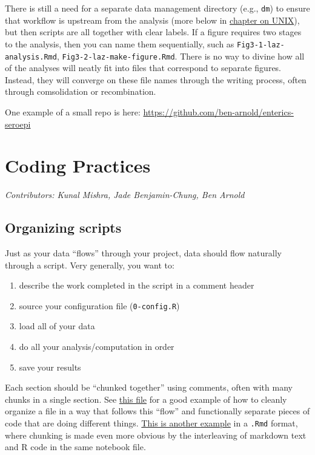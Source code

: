 \documentclass[
]{book}
\providecommand{\tightlist}{%
  \setlength{\itemsep}{0pt}\setlength{\parskip}{0pt}}
\begin{document}
There is still a need for a separate data management directory (e.g., \texttt{dm}) to ensure that workflow is upstream from the analysis (more below in \hyperref[unix]{chapter on UNIX}), but then scripts are all together with clear labels. If a figure requires two stages to the analysis, then you can name them sequentially, such as \texttt{Fig3-1-laz-analysis.Rmd}, \texttt{Fig3-2-laz-make-figure.Rmd}. There is no way to divine how all of the analyses will neatly fit into files that correspond to separate figures. Instead, they will converge on these file names through the writing process, often through comsolidation or recombination.

One example of a small repo is here:
\url{https://github.com/ben-arnold/enterics-seroepi}

\chapter{Coding Practices}\label{codingpractices}

\emph{Contributors: Kunal Mishra, Jade Benjamin-Chung, Ben Arnold}

\section{Organizing scripts}\label{organizing-scripts}

Just as your data ``flows'' through your project, data should flow naturally through a script. Very generally, you want to:

\begin{enumerate}
\def\labelenumi{\arabic{enumi}.}
\tightlist
\item
  describe the work completed in the script in a comment header
\item
  source your configuration file (\texttt{0-config.R})
\item
  load all of your data
\item
  do all your analysis/computation in order
\item
  save your results
\end{enumerate}

Each section should be ``chunked together'' using comments, often with many chunks in a single section. See \href{https://github.com/kmishra9/Flu-Absenteeism/blob/master/Master's%20Thesis%20-%20Spatial%20Epidemiology%20of%20Influenza/2a%20-%20Statistical-Inputs.R}{this file} for a good example of how to cleanly organize a file in a way that follows this ``flow'' and functionally separate pieces of code that are doing different things. \href{https://github.com/ben-arnold/enterics-seroepi/blob/master/R/Fig1-haiti-ab-distributions.Rmd}{This is another example} in a \texttt{.Rmd} format, where chunking is made even more obvious by the interleaving of markdown text and R code in the same notebook file.
\end{document}
